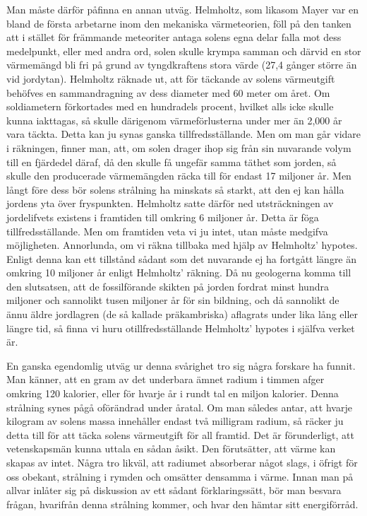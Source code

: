 \documentclass[a4paper, 12pt, oneside, swedish]{article}
\begin{document}
Man måste därför påfinna en annan utväg. Helmholtz, som likasom Mayer var en bland de första arbetarne inom den mekaniska värmeteorien, föll på den tanken att i stället för främmande meteoriter antaga solens egna delar falla mot dess medelpunkt, eller med andra ord, solen skulle krympa samman och därvid en stor värmemängd bli fri på grund av tyngdkraftens stora värde (27,4 gånger större än vid jordytan). Helmholtz räknade ut, att för täckande av solens värmeutgift behöfves en sammandragning av dess diameter med 60 meter om året. Om soldiametern förkortades med en hundradels procent, hvilket alls icke skulle kunna iakttagas, så skulle därigenom värmeförlusterna under mer än 2,000 år vara täckta. Detta kan ju synas ganska tillfredsställande. Men om man går vidare i räkningen, finner man, att, om solen drager ihop sig från sin nuvarande volym till en fjärdedel däraf, då den skulle få ungefär samma täthet som jorden, så skulle den producerade värmemängden räcka till för endast 17 miljoner år. Men långt före dess bör solens strålning ha minskats så starkt, att den ej kan hålla jordens yta över fryspunkten. Helmholtz satte därför ned utsträckningen av jordelifvets existens i framtiden till omkring 6 miljoner år. Detta är föga tillfredsställande. Men om framtiden veta vi ju intet, utan måste medgifva möjligheten. Annorlunda, om vi räkna tillbaka med hjälp av Helmholtz' hypotes. Enligt denna kan ett tillstånd sådant som det nuvarande ej ha fortgått längre än omkring 10 miljoner år enligt Helmholtz' räkning. Då nu geologerna komma till den slutsatsen, att de fossilförande skikten på jorden fordrat minst hundra miljoner och sannolikt tusen miljoner år för sin bildning, och då sannolikt de ännu äldre jordlagren (de så kallade präkambriska) aflagrats under lika lång eller längre tid, så finna vi huru otillfredsställande Helmholtz' hypotes i själfva verket är.

En ganska egendomlig utväg ur denna svårighet tro sig några forskare ha funnit. Man känner, att en gram av det underbara ämnet radium i timmen afger omkring 120 kalorier, eller för hvarje år i rundt tal en miljon kalorier. Denna strålning synes pågå oförändrad under åratal. Om man således antar, att hvarje kilogram av solens massa innehåller endast två milligram radium, så räcker ju detta till för att täcka solens värmeutgift för all framtid. Det är förunderligt, att vetenskapsmän kunna uttala en sådan åsikt. Den förutsätter, att värme kan skapas av intet. Några tro likväl, att radiumet absorberar något slags, i öfrigt för oss obekant, strålning i rymden och omsätter densamma i värme. Innan man på allvar inlåter sig på diskussion av ett sådant förklaringssätt, bör man besvara frågan, hvarifrån denna strålning kommer, och hvar den hämtar sitt energiförråd.
\end{document}
